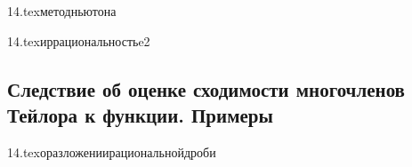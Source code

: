 {14.tex}{методньютона}

{14.tex}{иррациональностьe2}

\subsection{Следствие об оценке сходимости многочленов Тейлора к функции. Примеры}

{14.tex}{оразложениирациональнойдроби}

